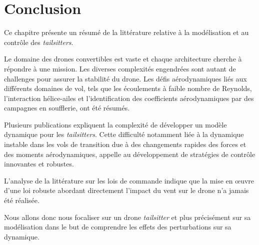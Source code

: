 \section{Conclusion}

Ce chapitre présente un résumé de la littérature relative à la modélisation et au contrôle des \textit{tailsitters}.

Le domaine des drones convertibles est vaste et chaque architecture cherche à répondre à une mission. Les diverses complexités engendrées sont autant de challenges pour assurer la stabilité du drone. Les défis aérodynamiques liés aux différents domaines de vol, tels que les écoulements à faible nombre de Reynolds, l'interaction hélice-ailes et l'identification des coefficients aérodynamiques par des campagnes en soufflerie, ont été résumés. 

Plusieurs publications expliquent la complexité de développer un modèle dynamique pour les \textit{tailsitters}. Cette difficulté notamment liée à la dynamique instable dans les vols de transition due à des changements rapides des forces et des moments aérodynamiques, appelle au développement de stratégies de contrôle innovantes et robustes. 

L'analyse de la littérature sur les lois de commande indique que la mise en œuvre d'une loi robuste abordant directement l'impact du vent sur le drone n'a jamais été réalisée.

Nous allons donc nous focaliser sur un drone \textit{tailsitter} et plus précisément sur sa modélisation dans le but de comprendre les effets des perturbations sur sa dynamique.
